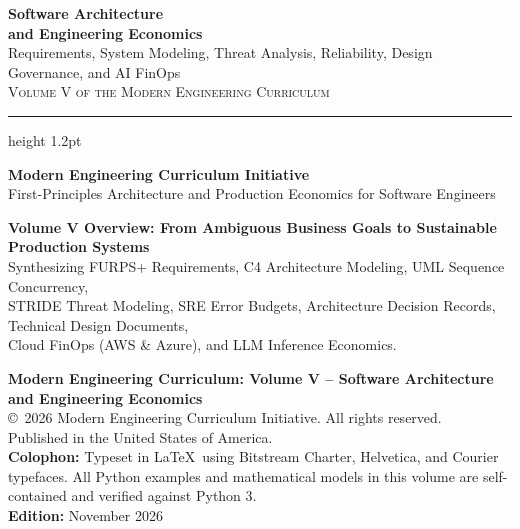 \documentclass[11pt,oneside]{book}
\begin{document}
\frontmatter

\begin{titlepage}
\begin{center}
  \vspace*{2.0cm}
  {\Huge\sffamily\bfseries\color{headingblue} Software Architecture\\and Engineering Economics}\\[14pt]
  {\Large\sffamily\color{gray} Requirements, System Modeling, Threat Analysis, Reliability, Design Governance, and AI FinOps}\\[24pt]
  {\normalsize\sffamily\scshape Volume V of the Modern Engineering Curriculum}\\[30pt]
  \hrule height 1.2pt
  \vspace*{30pt}

  {\large\sffamily\bfseries Modern Engineering Curriculum Initiative}\\[10pt]
  {\small\sffamily First-Principles Architecture and Production Economics for Software Engineers}

  \vfill

  \begin{tcolorbox}[
    enhanced,
    colback=white,
    colframe=gray!30!white,
    boxrule=0.8pt,
    arc=2pt,
    left=15pt,right=15pt,top=12pt,bottom=12pt
  ]
  \sffamily\footnotesize\centering
  \textbf{Volume V Overview: From Ambiguous Business Goals to Sustainable Production Systems}\\
  Synthesizing FURPS+ Requirements, C4 Architecture Modeling, UML Sequence Concurrency,\\
  STRIDE Threat Modeling, SRE Error Budgets, Architecture Decision Records, Technical Design Documents,\\
  Cloud FinOps (AWS \& Azure), and LLM Inference Economics.
  \end{tcolorbox}

  \vspace*{1.5cm}
\end{center}
\end{titlepage}

\newpage
\thispagestyle{empty}
\vspace*{\fill}
\begin{minipage}{\textwidth}
\sffamily\footnotesize\color{gray!80!black}
\textbf{Modern Engineering Curriculum: Volume V -- Software Architecture and Engineering Economics}\\
\copyright\ 2026 Modern Engineering Curriculum Initiative. All rights reserved.\\[10pt]
Published in the United States of America.\\[10pt]
\textbf{Colophon:} Typeset in \LaTeX\ using Bitstream Charter, Helvetica, and Courier typefaces.
All Python examples and mathematical models in this volume are self-contained and verified against Python 3.\\[10pt]
\textbf{Edition:} November 2026
\end{minipage}
\end{document}
